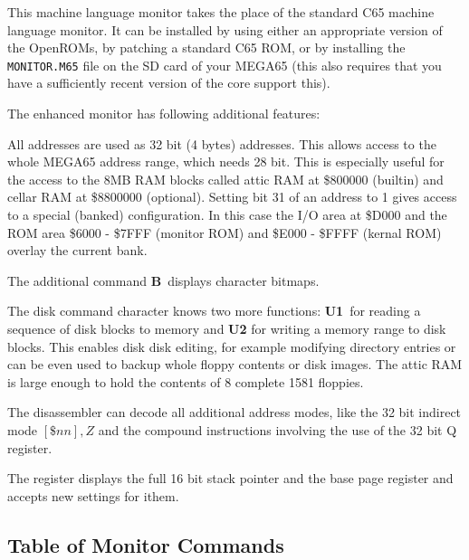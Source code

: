 This machine language monitor takes the place of the standard C65
machine language monitor. It can be installed by using either an
appropriate version of the OpenROMs, by patching a standard C65 ROM,
or by installing the {\tt MONITOR.M65} file on the SD card of your
MEGA65 (this also requires that you have a sufficiently recent version
of the core support this).

The enhanced monitor has following additional features:
\begin{description}[leftmargin=1cm,style=nextline]
\item[Adddresses:] All addresses are used as 32 bit (4 bytes) addresses.
   This allows access to the whole MEGA65 address range, which needs
   28 bit. This is especially useful for the access to the 8MB RAM blocks
   called attic RAM at \$800000 (builtin) and cellar RAM at
   \$8800000 (optional). Setting bit 31 of an address to 1 gives access
   to a special (banked) configuration. In this case the I/O area at \$D000
   and the ROM area \$6000 - \$7FFF (monitor ROM) and \$E000 - \$FFFF
   (kernal ROM) overlay the current bank.

\item[Commands:] The additional command {\bf B} displays character bitmaps.

\item[Disk access:] The disk command character {\bf \@} knows two more
  functions: {\bf U1} for reading a sequence of disk blocks to memory and
  {\bf U2} for writing a memory range to disk blocks. This enables disk
  disk editing, for example modifying directory entries or can be even
  used to backup whole floppy contents or disk images. The attic RAM is
  large enough to hold the contents of 8 complete 1581 floppies.

\item[Disassembler:] The disassembler can decode all additional
  address modes, like the 32 bit indirect mode $[\$nn],Z$
  and the compound instructions involving the use of the 32 bit Q register.

\item[Register:] The register displays the full 16 bit stack pointer
 and the base page register and accepts new settings for ithem.

\end{description}

\subsection{Table of Monitor Commands}

